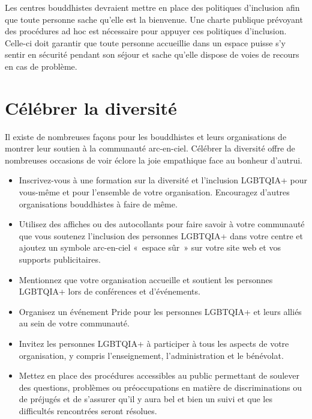 \documentclass[12pt,openany]{book}
\begin{document}
Les centres bouddhistes devraient mettre en place des politiques d’inclusion afin que toute personne sache qu’elle est la bienvenue. Une charte publique prévoyant des procédures ad hoc est nécessaire pour appuyer ces politiques d’inclusion. Celle-ci doit garantir que toute personne accueillie dans un espace puisse s’y sentir en sécurité pendant son séjour et sache qu’elle dispose de voies de recours en cas de problème.

\section*{Célébrer la diversité} 

\noindent Il existe de nombreuses façons pour les bouddhistes et leurs organisations de montrer leur soutien à la communauté arc-en-ciel. Célébrer la diversité offre de nombreuses occasions de voir éclore la joie empathique face au bonheur d’autrui.

\begin{itemize}[label=\textbullet, leftmargin=*]
  \setlength\itemsep{-0.3em}
  \item Inscrivez-vous à une formation sur la diversité et l’inclusion \mbox{LGBTQIA+} pour vous-même et pour l’ensemble de votre organisation. Encouragez d’autres organisations bouddhistes à faire de même.
  \item Utilisez des affiches ou des autocollants pour faire savoir à votre communauté que vous soutenez l’inclusion des personnes \mbox{LGBTQIA+} dans votre centre et ajoutez un symbole arc-en-ciel \mbox{« e}space sû\mbox{r »} sur votre site web et vos supports publicitaires.
  \item Mentionnez que votre organisation accueille et soutient les personnes \mbox{LGBTQIA+} lors de conférences et d’événements.
  \item Organisez un événement Pride pour les personnes \mbox{LGBTQIA+} et leurs alliés au sein de votre communauté.
  \item Invitez les personnes \mbox{LGBTQIA+} à participer à tous les aspects de votre organisation, y compris l’enseignement, l’administration et le bénévolat.
  \item Mettez en place des procédures accessibles au public permettant de soulever des questions, problèmes ou préoccupations en matière de discriminations ou de préjugés et de s’assurer qu’il y aura bel et bien un suivi et que les difficultés rencontrées seront résolues.
\end{itemize}
\end{document}
